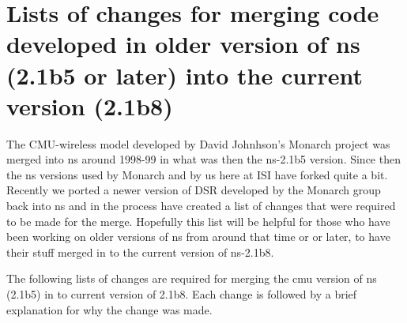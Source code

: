 \section{Lists of changes for merging code developed in older version of ns (2.1b5 or later) into the current version (2.1b8) }
\label{old-merge}

The CMU-wireless model developed by David Johnhson's Monarch project was merged into ns around 1998-99 in what was then the ns-2.1b5 version. Since then the ns versions used by Monarch and by us here at ISI have forked quite a bit. Recently we ported a newer version of DSR developed by the Monarch group back into ns and in the process have created a list of changes that were required to be made for the merge. Hopefully this list will be helpful for those who have been working on older versions of ns from around that time or or later, to have their stuff merged in to the current version of ns-2.1b8. 

The following lists of changes are required for merging the cmu version of ns (2.1b5) in to current version of 2.1b8. Each change is followed by a brief explanation for why the change was made.

